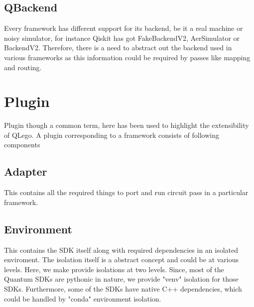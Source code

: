 \documentclass[11pt]{article}
\begin{document}
\subsection{QBackend}
Every framework has different support for its backend, be it a real machine or noisy simulator, for instance Qiskit has got FakeBackendV2, AerSimulator or BackendV2. Therefore, there is a need to abstract out the backend used in various frameworks as this information could be required by passes like mapping and routing.
\section{Plugin}
Plugin though a common term, here has been used to highlight the extensibility of QLego. A plugin corresponding to a framework consists of following components
\subsection{Adapter}
This contains all the required things to port and run circuit pass in a particular framework.
\subsection{Environment}
This contains the SDK itself along with required dependencies in an isolated enviroment. The isolation itself is a abstract concept and could be at various levels. Here, we make provide isolations at two levels. Since, most of the Quantum SDKs are pythonic in nature, we provide "venv" isolation for those SDKs. Furthermore, some of the SDKs have native C++ dependencies, which could be handled by "conda" environment isolation.
\end{document}
